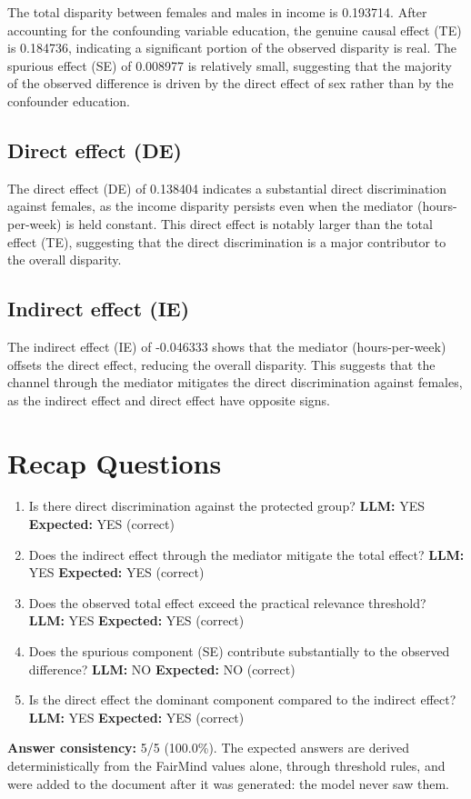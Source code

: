 \documentclass[11pt]{article}
\begin{document}
The total disparity between females and males in income is 0.193714. After accounting for the confounding variable education, the genuine causal effect (TE) is 0.184736, indicating a significant portion of the observed disparity is real. The spurious effect (SE) of 0.008977 is relatively small, suggesting that the majority of the observed difference is driven by the direct effect of sex rather than by the confounder education.

\subsection{Direct effect (DE)}

The direct effect (DE) of 0.138404 indicates a substantial direct discrimination against females, as the income disparity persists even when the mediator (hours-per-week) is held constant. This direct effect is notably larger than the total effect (TE), suggesting that the direct discrimination is a major contributor to the overall disparity.

\subsection{Indirect effect (IE)}

The indirect effect (IE) of -0.046333 shows that the mediator (hours-per-week) offsets the direct effect, reducing the overall disparity. This suggests that the channel through the mediator mitigates the direct discrimination against females, as the indirect effect and direct effect have opposite signs.

\section{Recap Questions}

\begin{enumerate}
\item Is there direct discrimination against the protected group? \textbf{LLM:} YES \quad \textbf{Expected:} YES \quad (correct)
\item Does the indirect effect through the mediator mitigate the total effect? \textbf{LLM:} YES \quad \textbf{Expected:} YES \quad (correct)
\item Does the observed total effect exceed the practical relevance threshold? \textbf{LLM:} YES \quad \textbf{Expected:} YES \quad (correct)
\item Does the spurious component (SE) contribute substantially to the observed difference? \textbf{LLM:} NO \quad \textbf{Expected:} NO \quad (correct)
\item Is the direct effect the dominant component compared to the indirect effect? \textbf{LLM:} YES \quad \textbf{Expected:} YES \quad (correct)
\end{enumerate}


\vspace{1em}
\noindent\textbf{Answer consistency:} 5/5 (100.0\%). The expected answers are derived deterministically from the FairMind values alone, through threshold rules, and were added to the document after it was generated: the model never saw them.
\end{document}
